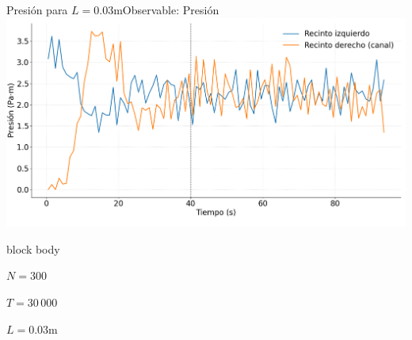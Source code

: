 \documentclass{beamer}
\begin{document}
\begin{frame}{Presión para $L=0.03$m}{Observable: Presión}
    \includegraphics[width=\linewidth]{resources/presion-recintos-L003.png}
    \begin{beamercolorbox}[sep=5pt,center]{block body}
        \begin{minipage}[t]{0.3\textwidth}
            \centering
            \small{$N=300$}
        \end{minipage}
        \hfill
        \begin{minipage}[t]{0.3\textwidth}
            \centering
            \small{$T=30\,000$}
        \end{minipage}
        \hfill
        \begin{minipage}[t]{0.3\textwidth}
            \centering
            \small{$L = 0.03$m}
        \end{minipage}
    \end{beamercolorbox}
\end{frame}
\end{document}
